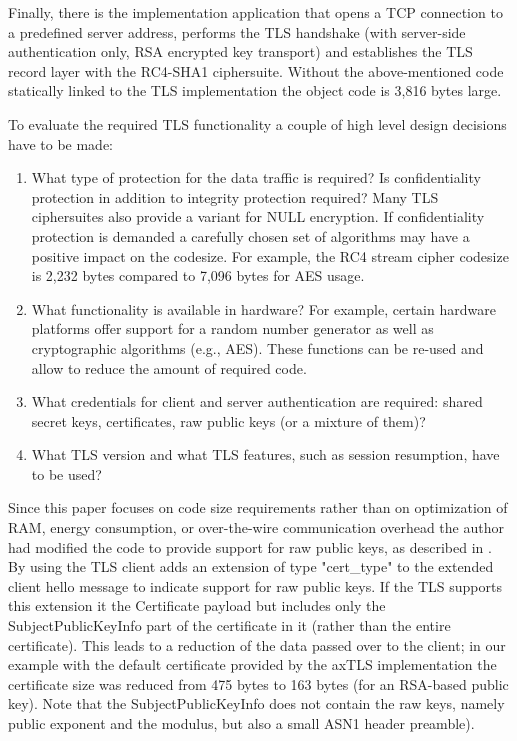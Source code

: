\documentclass[a4paper, 10pt]{IEEEtran}
\begin{document}
Finally, there is the implementation application that opens a TCP connection to a predefined server address, performs the TLS handshake (with server-side authentication only, RSA encrypted key transport) and establishes the TLS record layer with the RC4-SHA1 ciphersuite. Without the above-mentioned code statically linked to the TLS implementation the object code is 3,816 bytes large. 


To evaluate the required TLS functionality a couple of high level design decisions have 	to be made:

\begin{enumerate}
\item What type of protection for the data traffic is required? Is confidentiality protection in addition to integrity protection required? Many TLS ciphersuites also provide a variant for NULL encryption. If confidentiality protection is demanded a carefully chosen set of algorithms may have a positive impact on the codesize. For example, the RC4 stream cipher codesize is 2,232 bytes compared to 7,096 bytes for AES usage.
\item What functionality is available in hardware? For example, certain hardware platforms offer support for a random number generator as well as cryptographic algorithms (e.g., AES). These functions can be re-used and allow to reduce the amount of required code. 
\item What credentials for client and server authentication are required: shared secret keys, certificates, raw public keys (or a mixture of them)? 
\item What TLS version and what TLS features, such as session resumption, have to be used?
\end{enumerate} 

Since this paper focuses on code size requirements rather than on optimization of RAM, energy consumption, or over-the-wire communication overhead the author had modified the code to provide support for raw public keys, as described in \cite{I-d.ietf-tls-oob-pubkey}. By using \cite{I-d.ietf-tls-oob-pubkey} the TLS client adds an extension of type "cert\_type" to the extended client hello message to indicate support for raw public keys. If the TLS supports this extension it the Certificate payload but includes only the SubjectPublicKeyInfo part of the certificate in it (rather than the entire certificate). This leads to a reduction of the data passed over to the client; in our example with the default certificate provided by the axTLS implementation the certificate size was reduced from 475 bytes to 163 bytes (for an RSA-based public key). Note that the SubjectPublicKeyInfo does not contain the raw keys, namely public exponent and the modulus, but also a small ASN1 header preamble).  
\end{document}
